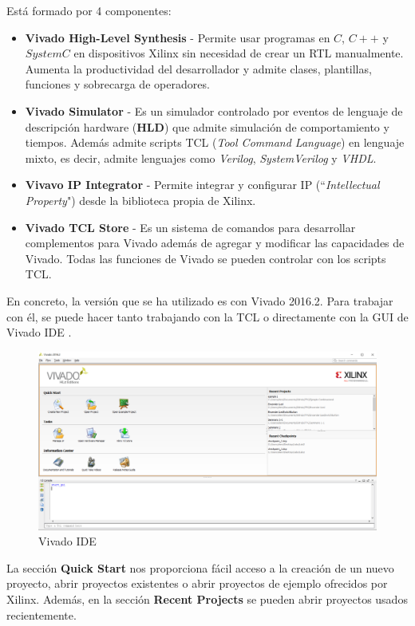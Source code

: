 Está formado por 4 componentes:
\begin{itemize}
    \item \textbf{Vivado High-Level Synthesis} - Permite usar programas en \(C\), \(C++\) y \(SystemC\) en dispositivos Xilinx  sin necesidad 
    de crear un RTL manualmente. Aumenta la productividad del desarrollador y admite clases, plantillas, funciones y sobrecarga de operadores.
    \item \textbf{Vivado Simulator} - Es un simulador controlado por eventos de lenguaje de descripción hardware (\textbf{HLD}) que admite 
    simulación de comportamiento y tiempos. Además admite scripts TCL (\textit{Tool Command Language}) en lenguaje mixto, es decir, admite
     lenguajes como \textit{Verilog}, \textit{SystemVerilog} y \textit{VHDL}.
    \item \textbf{Vivavo IP Integrator} - Permite integrar y  configurar IP (``\textit{Intellectual Property}") desde la biblioteca propia de Xilinx.
    \item \textbf{Vivado TCL Store} - Es un sistema de comandos para desarrollar complementos para Vivado además de agregar y modificar las 
    capacidades de Vivado. Todas las funciones de Vivado se pueden controlar con los scripts TCL.
\end{itemize}

En concreto, la versión que se ha utilizado es con Vivado 2016.2. Para trabajar con él, se puede hacer tanto trabajando con la TCL o 
directamente con la GUI de Vivado IDE \cite{vivadoIDE}. 
\begin{figure}[H]
    \centering
    \includegraphics[width = 1\textwidth]{imagenes/Vivado1.png}
    \caption{Vivado IDE}\label{vivadoGUI}
\end{figure}

La sección \textbf{Quick Start} nos proporciona fácil acceso a la creación de un nuevo proyecto, abrir proyectos existentes o abrir proyectos 
de ejemplo ofrecidos por Xilinx. Además, en la sección \textbf{Recent Projects} se pueden abrir proyectos usados recientemente.

